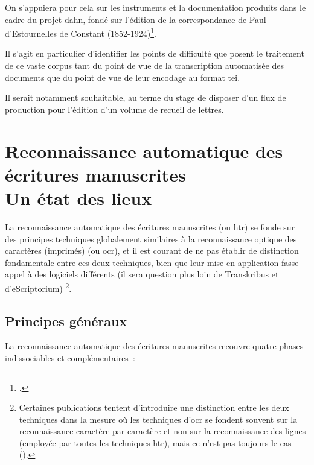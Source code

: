 \documentclass[a4paper,12pt,twoside]{book}
\begin{document}
			On s'appuiera pour cela sur les instruments et la documentation produits dans le cadre du projet \gls{dahn}, fondé sur l'édition de la correspondance de Paul d’Estournelles de Constant (1852-1924)\footcite{chiffoleauDAHNProject}.
			
			Il s'agit en particulier d'identifier les points de difficulté que posent le traitement de ce vaste corpus tant du point de vue de la transcription automatisée des documents que du point de vue de leur encodage au format \gls{tei}. 
			
			Il serait notamment souhaitable, au terme du stage de disposer d'un flux de production pour l'édition d'un volume de recueil de lettres.
				
	\chapter[HTR~: état des lieux]{Reconnaissance automatique des écritures manuscrites \\ \large Un état des lieux}
		
		La reconnaissance automatique des écritures manuscrites (ou \gls{htr}) se fonde sur des principes techniques globalement similaires à la reconnaissance optique des caractères (imprimés) (ou \gls{ocr}), et il est courant de ne pas établir de distinction fondamentale entre ces deux techniques, bien que leur mise en application fasse appel à des logiciels différents (il sera question plus loin de Transkribus et d'eScriptorium)
		\footnote{Certaines publications tentent d'introduire une distinction entre les deux techniques dans la mesure où les techniques d'\gls{ocr} se fondent souvent sur la reconnaissance caractère par caractère et non sur la reconnaissance des lignes (employée par toutes les techniques \gls{htr}), mais ce n'est pas toujours le cas (\cite{stokesEScriptoriumVREManuscript2021}).}.
		
		\section{Principes généraux}
		
			La reconnaissance automatique des écritures manuscrites recouvre quatre phases indissociables et complémentaires~:
			
\end{document}
